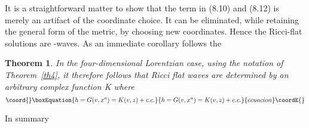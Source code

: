 \documentclass[12pt,a4paper]{article}
\newcounter{theorem}
\newtheorem{theorem}{Theorem}[section]   %
\newcounter{eg}
\begin{document}
It is a straightforward matter to show that the term \coordHE{} in (8.10)
and (8.12) is merely an artifact of the coordinate choice. It can be
eliminated, while retaining the general form of the metric, by
choosing new \coordHE{} coordinates.  Hence the Ricci-flat solutions are
\coordHE{}-waves. As an immediate corollary follows the

\begin{theorem} 

In the four-dimensional Lorentzian case, using the notation of
Theorem~\ref{th4}, it therefore follows that {\em Ricci flat \coordHE{} waves} are
determined by an arbitrary complex function K where
\begin{equation}\coord{}\boxEquation{
h = G(v,x^{a}) = K(v,z) + c.c.
}{
h = G(v,x^{a}) = K(v,z) + c.c.
}{ecuacion}\coordE{}\end{equation}

\end{theorem}


In summary
\end{document}
